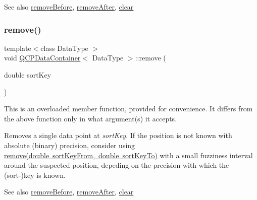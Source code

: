\begin{DoxySeeAlso}{See also}
\mbox{\hyperlink{class_q_c_p_data_container_aa7f74cbce304b0369e1626c3798e1eda}{remove\+Before}}, \mbox{\hyperlink{class_q_c_p_data_container_abbe5d87ffc10b5aeffa5bb42cf03aa3c}{remove\+After}}, \mbox{\hyperlink{class_q_c_p_data_container_a7e2b29736c6fd761649bda1a54ba967f}{clear}} 
\end{DoxySeeAlso}
\mbox{\label{class_q_c_p_data_container_a2dbded7f0732bacf9db48fdfbbb620bc}} 
\subsubsection{\texorpdfstring{remove()}{remove()}\hspace{0.1cm}{\footnotesize\ttfamily [2/2]}}
{\footnotesize\ttfamily template$<$class Data\+Type $>$ \\
void \mbox{\hyperlink{class_q_c_p_data_container}{Q\+C\+P\+Data\+Container}}$<$ Data\+Type $>$\+::remove (\begin{DoxyParamCaption}\item[{double}]{sort\+Key }\end{DoxyParamCaption})}

This is an overloaded member function, provided for convenience. It differs from the above function only in what argument(s) it accepts.

Removes a single data point at {\itshape sort\+Key}. If the position is not known with absolute (binary) precision, consider using \mbox{\hyperlink{class_q_c_p_data_container_ae5f569a120648b167efa78835f12fd38}{remove(double sort\+Key\+From, double sort\+Key\+To)}} with a small fuzziness interval around the suspected position, depeding on the precision with which the (sort-\/)key is known.

\begin{DoxySeeAlso}{See also}
\mbox{\hyperlink{class_q_c_p_data_container_aa7f74cbce304b0369e1626c3798e1eda}{remove\+Before}}, \mbox{\hyperlink{class_q_c_p_data_container_abbe5d87ffc10b5aeffa5bb42cf03aa3c}{remove\+After}}, \mbox{\hyperlink{class_q_c_p_data_container_a7e2b29736c6fd761649bda1a54ba967f}{clear}} 
\end{DoxySeeAlso}
\mbox{\label{class_q_c_p_data_container_abbe5d87ffc10b5aeffa5bb42cf03aa3c}} 

